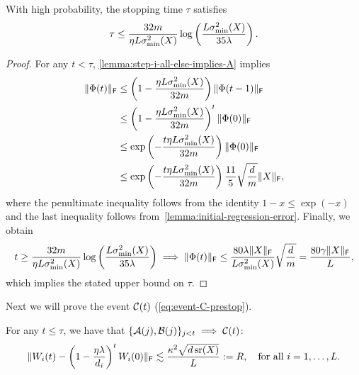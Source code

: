 \begin{corollary}
    \label{corollary:length-of-step-1}
    With high probability, the stopping time $\tau$ satisfies
    \[
        \tau \leq
        \frac{32 m}{\eta L \sigma_{\min}^2(X)}
        \log\left(
          \frac{L \sigma_{\min}^2(X)}{35 \lambda}
        \right).
    \]
\end{corollary}
\begin{proof}
    For any $t < \tau$, \cref{lemma:step-i-all-else-implies-A} implies
    \begin{align*}
        \lVert\Phi(t)\rVert_{\mathsf{F}} &\leq
        \left(
        1 - \frac{\eta L \sigma_{\min}^2(X)}{32m}
      \right) \lVert\Phi(t-1)\rVert_{\mathsf{F}} \\ &\leq
        \left(1 - \frac{\eta L \sigma_{\min}^2(X)}{32m} \right)^{t} \lVert\Phi(0)\rVert_{\mathsf{F}} \\
        &\leq
        \exp\left(
        -\frac{t \eta L \sigma_{\min}^2(X)}{32 m}
    \right) \lVert\Phi(0)\rVert_{\mathsf{F}} \\ &\leq
        \exp\left(
        -\frac{t \eta L \sigma_{\min}^2(X)}{32 m}
      \right) \frac{11}{5} \sqrt{\frac{d}{m}} \lVert X\rVert_{\mathsf{F}},
    \end{align*}
    where the penultimate inequality follows from the identity $1 - x \leq \exp(-x)$ and
    the last inequality follows from~\cref{lemma:initial-regression-error}. Finally,
    we obtain
    \[
      t \geq \frac{32 m}{\eta L \sigma^2_{\min}(X)}
        \log\left(
          \frac{L \sigma_{\min}^2(X)}{35 \lambda}
        \right) \implies
        \lVert\Phi(t)\rVert_{\mathsf{F}} \leq
        \frac{80 \lambda \lVert X\rVert_{\mathsf{F}}}{
        L \sigma_{\min}^2(X)
      } \sqrt{\frac{d}{m}}
      = \frac{80 \gamma \lVert X\rVert_{\mathsf{F}}}{L},
    \]
    which implies the stated upper bound on
    $\tau$.
\end{proof}
Next we will prove the event $\mathcal{C}(t)$ (\cref{eq:event-C-prestop}).
\begin{lemma}
  \label{lemma:Bj-implies-Ct-phase-1}
  For any $t \leq \tau$, we have that
  $\{\mathcal{A}(j), \mathcal{B}(j)\}_{j < t} \implies \mathcal{C}(t)$: 
  \begin{equation}
    \lVert W_{i}(t) - \left(1 - \frac{\eta \lambda}{d_i}\right)^{t} W_{i}(0)\rVert_{\mathsf{F}}
    \lesssim
    \frac{\kappa^2 \sqrt{d \operatorname{\mathrm{sr}}(X)}}{L} := R
    , \quad
    \text{for all $i = 1, \dots, L$.}
    \label{eq:Wi-travel-distance-improved}
  \end{equation}
\end{lemma}
